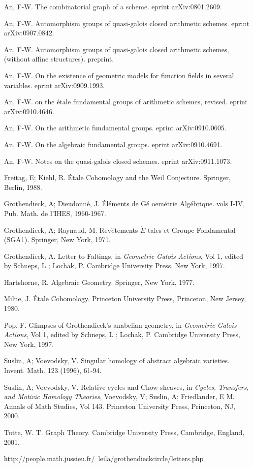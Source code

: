 \documentclass[12pt,twoside,reqno]{amsart}
\theoremstyle{definition}
\numberwithin{equation}{section}
\begin{document}
\begin{thebibliography}{99}

 An, F-W. The combinatorial graph of a scheme. eprint arXiv:0801.2609.

 An, F-W. Automorphism groups of quasi-galois closed arithmetic
schemes. eprint arXiv:0907.0842.

 An, F-W. Automorphism groups of quasi-galois closed
arithmetic schemes, (without affine structures). preprint.

 An, F-W. On the existence of geometric models for function
fields in several variables. eprint arXiv:0909.1993.

 An, F-W. on the \'{e}tale fundamental groups of arithmetic
schemes, revised. eprint arXiv:0910.4646.

 An, F-W. On the arithmetic fundamental groups. eprint
arXiv:0910.0605.

 An, F-W. On the algebraic fundamental groups. eprint
arXiv:0910.4691.

 An, F-W. Notes on the quasi-galois closed schemes. eprint
arXiv:0911.1073.

 Freitag, E; Kiehl, R. \'{E}tale Cohomology and the Weil
Conjecture. Springer, Berlin, 1988.

 Grothendieck, A; Dieudonn\'{e}, J. \'{E}l\'{e}ments de G\'{e}%
oem\'{e}trie Alg\'{e}brique. vols I-IV, Pub. Math. de l'IHES, 1960-1967.

 Grothendieck, A; Raynaud, M. Rev$\hat{e}$tements $\acute{E}$%
tales et Groupe Fondamental (SGA1). Springer, New York, 1971.

 Grothendieck, A. Letter to Faltings, in \emph{Geometric
Galois Actions}, Vol 1, edited by Schneps, L ; Lochak, P. Cambridge
University Press, New York, 1997.

 Hartshorne, R. Algebraic Geometry. Springer, New York, 1977.

 Milne, J. \'{E}tale Cohomology. Princeton University Press,
Princeton, New Jersey, 1980.

 Pop, F. Glimpses of Grothendieck's anabelian geometry, in
\emph{Geometric Galois Actions}, Vol 1, edited by Schneps, L ; Lochak, P.
Cambridge University Press, New York, 1997.

 Suslin, A; Voevodsky, V. Singular homology of abstract
algebraic varieties. Invent. Math. 123 (1996), 61-94.

 Suslin, A; Voevodsky, V. Relative cycles and
Chow sheaves, in \emph{Cycles, Transfers, and Motivic Homology
Theories}, Voevodsky, V; Suslin, A; Friedlander, E M. Annals of Math
Studies, Vol 143. Princeton University Press, Princeton, NJ, 2000.

 Tutte, W. T. Graph Theory. Cambridge University Press, Cambridge, England, 2001.

 http://people.math.jussieu.fr/~leila/grothendieckcircle/letters.php
\end{thebibliography}
\end{document}

